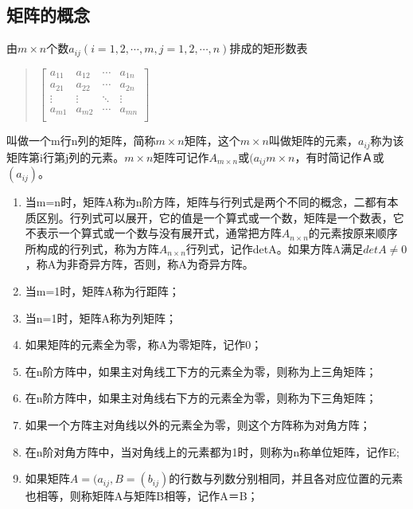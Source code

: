 \documentclass[a4paper,10pt]{article}
\begin{document}
\begin{CJK}{UTF8}{song}
\section{矩阵的概念}
由$m\times{}n$个数$a_{ij}(i=1,2,\cdots,m,j=1,2,\cdots,n)$排成的矩形数表
\begin{quote}
$
\left[\begin{array}{cccc}
a_{11}&a_{12}&\cdots{}&a_{1n} \\
a_{21}&a_{22}&\cdots{}&a_{2n} \\
\vdots&\vdots&\ddots{}&\vdots \\
a_{m1}&a_{m2}&\cdots{}&a_{mn} \\    
\end{array}\right]     
$
\end{quote}
叫做一个m行n列的矩阵，简称$m\times{}n$矩阵，这个$m\times{}n$叫做矩阵的元素，$a_{ij}$称为该矩阵第i行第j列的元素。$m\times{}n$矩阵可记作$A_{m\times{}n}$或$(a_{ij}m\times{}n$，有时简记作Ａ或$(a_{ij})$。
\begin{enumerate}
\item 当m=n时，矩阵A称为n阶方阵，矩阵与行列式是两个不同的概念，二都有本质区别。行列式可以展开，它的值是一个算式或一个数，矩阵是一个数表，它不表示一个算式或一个数与没有展开式，通常把方阵$A_{n\times{}n}$的元素按原来顺序所构成的行列式，称为方阵$A_{n\times{}n}$行列式，记作detA。如果方阵A满足$detA\neq{}0$，称A为非奇异方阵，否则，称A为奇异方阵。
\item 当m=1时，矩阵A称为行距阵；
\item 当n=1时，矩阵A称为列矩阵；
\item 如果矩阵的元素全为零，称A为零矩阵，记作0；
\item 在n阶方阵中，如果主对角线工下方的元素全为零，则称为上三角矩阵；
\item 在n阶方阵中，如果主对角线右下方的元素全为零，则称为下三角矩阵；
\item 如果一个方阵主对角线以外的元素全为零，则这个方阵称为对角方阵；
\item 在n阶对角方阵中，当对角线上的元素都为1时，则称为n称单位矩阵，记作E;
\item 如果矩阵$A=(a_{ij},B=(b_{ij})$的行数与列数分别相同，并且各对应位置的元素也相等，则称矩阵A与矩阵B相等，记作A＝B；
\end{enumerate}

\end{CJK}
\end{document}
